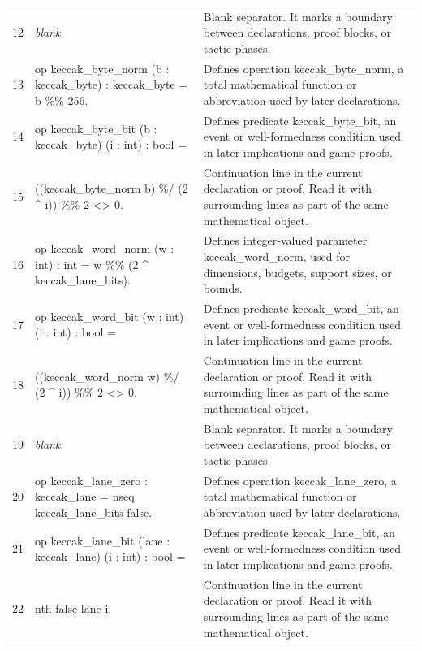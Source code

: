 \documentclass[10pt]{article}
\begin{document}
\begin{longtable}{r L{0.53\textwidth} L{0.37\textwidth}}
12 & {\ttfamily\scriptsize \emph{blank}} & Blank separator.  It marks a boundary between declarations, proof blocks, or tactic phases. \\
13 & {\ttfamily\scriptsize op keccak\_byte\_norm (b : keccak\_byte) : keccak\_byte = b \%\% 256.} & Defines operation keccak\_byte\_norm, a total mathematical function or abbreviation used by later declarations. \\
14 & {\ttfamily\scriptsize op keccak\_byte\_bit (b : keccak\_byte) (i : int) : bool =} & Defines predicate keccak\_byte\_bit, an event or well-formedness condition used in later implications and game proofs. \\
15 & {\ttfamily\scriptsize   ((keccak\_byte\_norm b) \%/ (2 \textasciicircum{} i)) \%\% 2 <> 0.} & Continuation line in the current declaration or proof.  Read it with surrounding lines as part of the same mathematical object. \\
16 & {\ttfamily\scriptsize op keccak\_word\_norm (w : int) : int = w \%\% (2 \textasciicircum{} keccak\_lane\_bits).} & Defines integer-valued parameter keccak\_word\_norm, used for dimensions, budgets, support sizes, or bounds. \\
17 & {\ttfamily\scriptsize op keccak\_word\_bit (w : int) (i : int) : bool =} & Defines predicate keccak\_word\_bit, an event or well-formedness condition used in later implications and game proofs. \\
18 & {\ttfamily\scriptsize   ((keccak\_word\_norm w) \%/ (2 \textasciicircum{} i)) \%\% 2 <> 0.} & Continuation line in the current declaration or proof.  Read it with surrounding lines as part of the same mathematical object. \\
19 & {\ttfamily\scriptsize \emph{blank}} & Blank separator.  It marks a boundary between declarations, proof blocks, or tactic phases. \\
20 & {\ttfamily\scriptsize op keccak\_lane\_zero : keccak\_lane = nseq keccak\_lane\_bits false.} & Defines operation keccak\_lane\_zero, a total mathematical function or abbreviation used by later declarations. \\
21 & {\ttfamily\scriptsize op keccak\_lane\_bit (lane : keccak\_lane) (i : int) : bool =} & Defines predicate keccak\_lane\_bit, an event or well-formedness condition used in later implications and game proofs. \\
22 & {\ttfamily\scriptsize   nth false lane i.} & Continuation line in the current declaration or proof.  Read it with surrounding lines as part of the same mathematical object. \\

\end{longtable}
\end{document}
